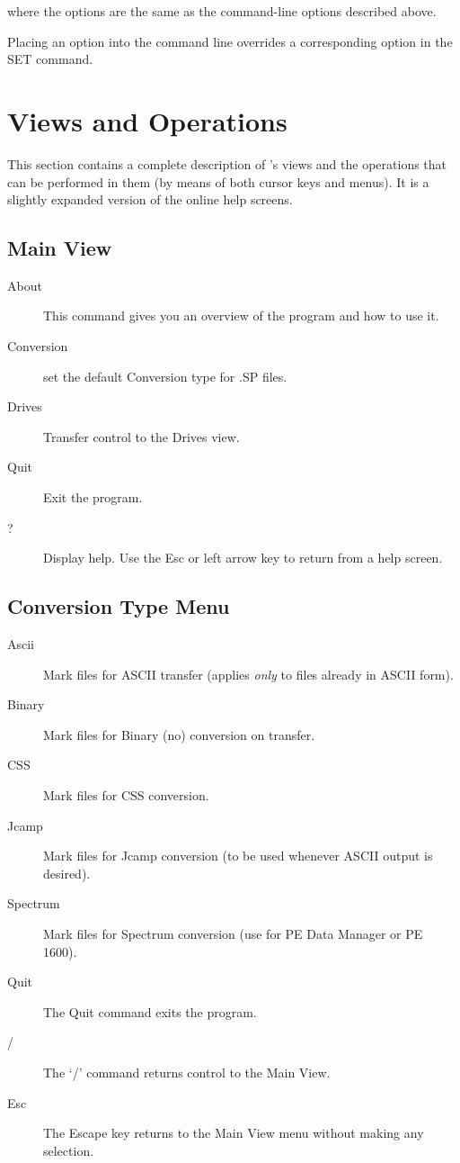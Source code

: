 \begin{itemize}
\noindent where the options are the same as the command-line options
described above.

Placing an option into the command line overrides a corresponding
option in the SET command.

\chapter{Views and Operations}
 
 
This section contains a complete description of \RD's views and the
operations that can be performed in them (by means of both cursor keys
and menus).  It is a slightly expanded version of the online
help screens.

 
\section{Main View}
\begin{description}
\item[About]\nl
           This command gives you an overview of the program and
           how to use it.
\item[Conversion]\nl
           set the default Conversion type for .SP files.
\item[Drives]\nl
           Transfer control to the Drives view.
\item[Quit]\nl
           Exit the program.
\item[?]\nl
           Display help.
           Use the Esc or left arrow key to return from a help screen.
\end{description}

\section{Conversion Type Menu}
\begin{description}
\item[Ascii]\nl
	Mark files for ASCII transfer (applies {\em only} to files
	already in ASCII form).
\item[Binary]\nl
	Mark files for Binary (no) conversion on transfer.
\item[CSS]\nl
	Mark  files for CSS conversion.
\item[Jcamp]\nl
	Mark  files for Jcamp conversion (to be used
	whenever ASCII output is desired).
\item[Spectrum]\nl
	Mark  files for Spectrum conversion (use for PE Data
	Manager or PE 1600).
\item[Quit]\nl
           The Quit command exits the program.
\item[/]\nl
           The `/' command returns control to the Main View.
\item[Esc]\nl
           The Escape key returns to the Main View menu without making
           any selection.
\end{description}


\end{itemize}
